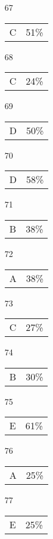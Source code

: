 \documentclass{article}
\begin{document}
\begin{multicols}{4}
\begin{enumerate}
    \item[67] \begin{tabular}{cc} C & 51\%\end{tabular}
    
    \item[68] \begin{tabular}{cc} C & 24\%\end{tabular}
    
    \item[69] \begin{tabular}{cc} D & 50\%\end{tabular}
    
    \item[70] \begin{tabular}{cc} D & 58\%\end{tabular}
    
       \item[]
    
    \item[71] \begin{tabular}{cc} B & 38\%\end{tabular}
    
    \item[72] \begin{tabular}{cc} A & 38\%\end{tabular}
    
    \item[73] \begin{tabular}{cc} C & 27\%\end{tabular}
    
    \item[74] \begin{tabular}{cc} B & 30\%\end{tabular}
    
    \item[75] \begin{tabular}{cc} E & 61\%\end{tabular}
    
       \item[]
    
    \item[76] \begin{tabular}{cc} A & 25\%\end{tabular}
    
    \item[77] \begin{tabular}{cc} E & 25\%\end{tabular}
    

\end{enumerate}
\end{multicols}
\end{document}
